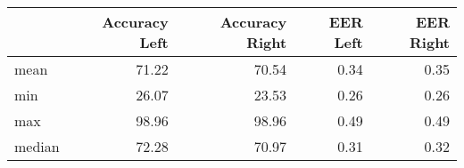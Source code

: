 \begin{tabular}{lrrrr}
\toprule
{} &  Accuracy Left &  Accuracy Right &  EER Left &  EER Right \\
\midrule
mean   &          71.22 &           70.54 &      0.34 &       0.35 \\
min    &          26.07 &           23.53 &      0.26 &       0.26 \\
max    &          98.96 &           98.96 &      0.49 &       0.49 \\
median &          72.28 &           70.97 &      0.31 &       0.32 \\
\bottomrule
\end{tabular}
